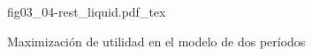 \begin{figure}[h]
\centering
\def\svgwidth{0.5\textwidth}
{fig03_04-rest_liquid.pdf_tex}
\caption{Maximización de utilidad en el modelo de dos períodos}
\label{fig03_04-rest_liquid}
\end{figure}